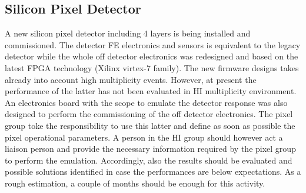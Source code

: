 \subsection{Silicon Pixel Detector\label{subsec:SiPixel}}
A new silicon pixel detector including 4 layers is being installed and commissioned. The detector FE electronics and
sensors is equivalent to the legacy detector while the whole off detector electronics was redesigned and based on the
latest FPGA technology (Xilinx virtex-7 family). The new firmware designs takes already into account high multiplicity
events. However, at present the performance of the latter has not been evaluated in HI multiplicity environment. An
electronics board with the scope to emulate the detector response was also designed to perform the commissioning of the
off detector electronics. The pixel group toke the responsibility to use this latter and define as soon as possible the
pixel operational parameters. A person in the HI group should however act a liaison person and provide the necessary
information required by the pixel group to perform the emulation. Accordingly, also the results should be evaluated and
possible solutions identified in case the performances are below expectations. As a rough estimation, a couple of months
should be enough for this activity.


